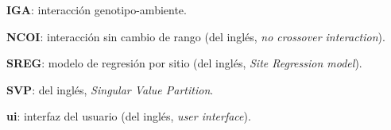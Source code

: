 \begin{description}
\item{\textbf{IGA}}: interacción genotipo-ambiente.

\item{\textbf{NCOI}}: interacción sin cambio de rango (del inglés, \emph{no crossover interaction}).

\item{\textbf{SREG}}: modelo de regresión por sitio (del inglés, \emph{Site Regression model}).

\item{\textbf{SVP}}: del inglés, \emph{Singular Value Partition}.

\item{\textbf{ui}}: interfaz del usuario (del inglés, \emph{user interface}).


\end{description}
